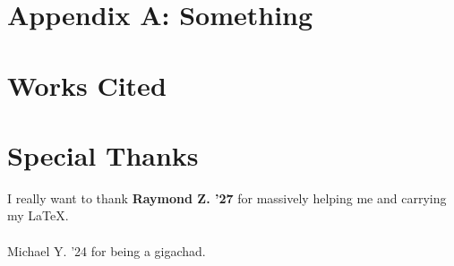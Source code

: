 \documentclass[11pt]{scrartcl}
\begin{document}
\appendix{}
\section{Appendix A: Something}

\section{Works Cited}

\section{Special Thanks}
I really want to thank \textbf{Raymond Z. '27} for massively helping me
and carrying my \LaTeX.

\paragraph{}

Michael Y. '24 for being a gigachad.
\end{document}
